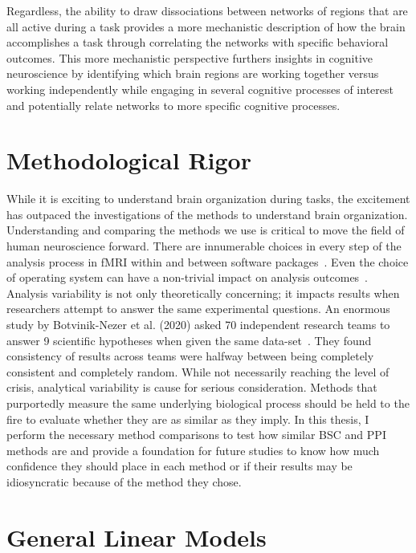 \documentclass[phd,figures,tables,ackpage,abstractpage,publicabstractpage]{uithesis}
\begin{document}
Regardless, the ability to draw dissociations between networks of regions that are all active
during a task provides a more mechanistic description of how the brain accomplishes a task
through correlating the networks with specific behavioral outcomes.
This more mechanistic perspective furthers insights in cognitive neuroscience by identifying
which brain regions are working together versus working independently while engaging
in several cognitive processes of interest and potentially relate networks to more specific
cognitive processes.

\section{Methodological Rigor}

While it is exciting to understand brain organization during tasks,
the excitement has outpaced the investigations of the methods to understand brain organization.
Understanding and comparing the methods we use is critical to move the field of
human neuroscience forward.
There are innumerable choices in every step of the analysis process in
fMRI within and between software packages~\cite{Bowring2019,Carp2012}.
Even the choice of operating system can have a non-trivial impact on
analysis outcomes~\cite{Glatard2015}.
Analysis variability is not only theoretically concerning; it impacts
results when researchers attempt to answer the same experimental questions.
An enormous study by Botvinik-Nezer et al. (2020) asked 70 independent research teams
to answer 9 scientific hypotheses when given the same data-set~\cite{Botvinik-Nezer2020}.
They found consistency of results across teams were halfway between
being completely consistent and completely random.
While not necessarily reaching the level of crisis,
analytical variability is cause for serious consideration.
Methods that purportedly measure the same underlying biological process
should be held to the fire to evaluate whether they are as similar
as they imply.
In this thesis, I perform the necessary method comparisons
to test how similar BSC and PPI methods are and provide a foundation
for future studies to know how much confidence they should
place in each method or if their results may be idiosyncratic
because of the method they chose.

\section{General Linear Models}
\end{document}
